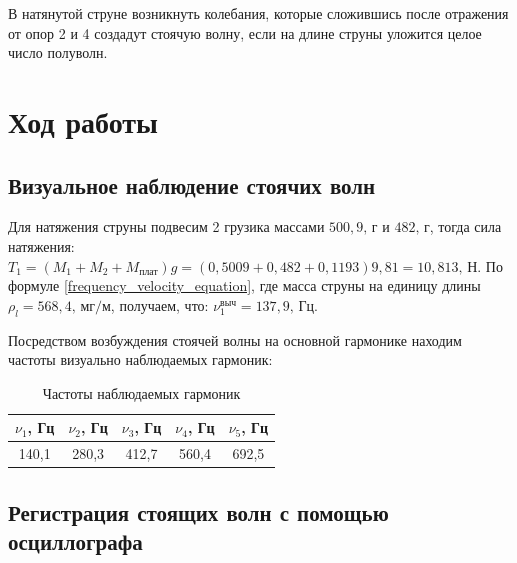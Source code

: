 \documentclass[a4paper,12pt]{article}
\begin{document}
	В натянутой струне возникнуть колебания, которые сложившись после отражения от опор 2 и 4 создадут стоячую волну, если на длине струны уложится целое число полуволн.
	
	\section{Ход работы}
	\subsection{Визуальное наблюдение стоячих волн}
	
	Для натяжения струны подвесим 2 грузика массами $500,9 \text{, г}$ и $482\text{, г}$, тогда сила натяжения: $T_1 = (M_1 + M_2 + M_\text{плат})g = (0,5009 + 0,482 + 0,1193)9,81  = 10,813 \text{, Н}$. По формуле \eqref{frequency_velocity_equation}, где масса струны на единицу длины $\rho_l = 568,4\text{, мг}/\text{м}$, получаем, что: $\nu_1^{\text{выч}} = 137,9\text{, Гц}$.
	
	Посредством возбуждения стоячей волны на основной гармонике находим частоты визуально наблюдаемых гармоник:
	\begin{table}[!h]
		\begin{center}
			\begin{tabular}{|c|c|c|c|c|}
				\hline
				$\nu_1$, Гц &$\nu_2$, Гц& $\nu_3$, Гц& $\nu_4$, Гц& $\nu_5$, Гц\\
				\hline
				140,1 & 280,3 & 412,7 & 560,4& 692,5\\
				\hline 
			\end{tabular}
		\caption{Частоты наблюдаемых гармоник}
		\end{center}
	\end{table}

	\subsection{Регистрация стоящих волн с помощью осциллографа}
	
\end{document}
